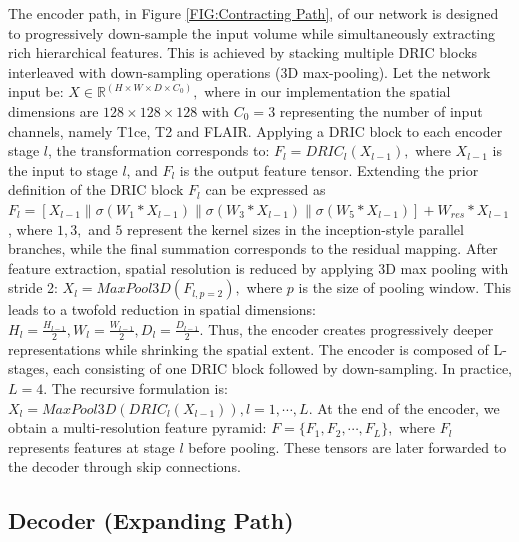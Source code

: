 The encoder path, in Figure \ref{FIG:Contracting Path}, of our network is designed to progressively down-sample the input volume while simultaneously extracting rich hierarchical features. This is achieved by stacking multiple DRIC blocks interleaved with down-sampling operations (3D max-pooling).
Let the network input be: $X\in \mathbb{R}^{(H\times W\times D\times C_0)},$ where in our implementation the spatial dimensions are $128\times 128\times 128$ with $C_0 = 3$ representing the number of input channels, namely T1ce, T2 and FLAIR. Applying a DRIC block to each encoder stage $l$, the transformation corresponds to: $F_l=DRIC_l(X_{l-1}),$ where $X_{l-1}$ is the input to stage $l$, and $F_l$ is the output feature tensor. Extending the prior definition of the DRIC block $F_l$ can be expressed as $F_l=[X_{l-1} \| \sigma(W_1 *X_{l-1}) \| \sigma(W_3 *X_{l-1} ) \| \sigma(W_5 *X_{l-1} )]+W_{res} *X_{l-1}$, where $1, 3,$ and $5$ represent the kernel sizes in the inception-style parallel branches, while the final summation corresponds to the residual mapping.
After feature extraction, spatial resolution is reduced by applying 3D max pooling with stride 2:   $X_l=MaxPool3D(F_{l,p=2}),$ where $p$ is the size of pooling window. This leads to a twofold reduction in spatial dimensions: $H_l=\tfrac{H_{l-1}}{2}, W_l=\tfrac{W_{l-1}}{2}, D_l=\tfrac{D_{l-1}}{2}$. Thus, the encoder creates progressively deeper representations while shrinking the spatial extent.
The encoder is composed of L-stages, each consisting of one DRIC block followed by down-sampling. In practice, $L=4$. The recursive formulation is: $X_l=MaxPool3D(DRIC_l (X_{l-1})), l=1,\cdots,L$.
At the end of the encoder, we obtain a multi-resolution feature pyramid: $F=\{F_1,F_2,\cdots,F_L\},$ where $F_l$ represents features at stage $l$ before pooling. These tensors are later forwarded to the decoder through skip connections.


\subsection{Decoder (Expanding Path)}

